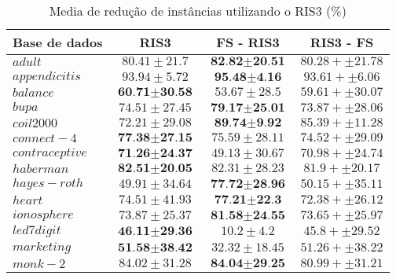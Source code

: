 \documentclass[a4paper, 12pt]{article}
\begin{document}
\begin{table}[h!]
  \begin{center}
    \caption{Media de redução de instâncias utilizando o RIS3 (\%)}
    \label{tab:table8}
    \begin{tabular}{l|c|c|c}
      \textbf{Base de dados} & \textbf{ RIS3 } & \textbf{FS - RIS3} & \textbf{RIS3 - FS}\\
        \hline
        $adult$ & $80.41 \pm 21.7$  & $\textbf{82.82} \pm \textbf{20.51}$ & $80.28 +  \pm 21.78$ \\
        \hline
        $appendicitis$ & $93.94 \pm 5.72$  & $\textbf{95.48} \pm \textbf{4.16}$ & $93.61 +  \pm 6.06$ \\
        \hline
        $balance$ & $\textbf{60.71} \pm \textbf{30.58}$  & $53.67 \pm 28.5$ & $59.61 +  \pm 30.07$ \\
        \hline
        $bupa$ & $74.51 \pm 27.45$  & $\textbf{79.17} \pm \textbf{25.01}$ & $73.87 +  \pm 28.06$ \\
        \hline
        $coil2000$ & $72.21 \pm 29.08$  & $\textbf{89.74} \pm \textbf{9.92}$ & $85.39 +  \pm 11.28$ \\
        \hline
        $connect-4$ & $\textbf{77.38} \pm \textbf{27.15}$  & $75.59 \pm 28.11$ & $74.52 +  \pm 29.09$ \\
        \hline
        $contraceptive$ & $\textbf{71.26} \pm \textbf{24.37}$  & $49.13 \pm 30.67$ & $70.98 +  \pm 24.74$ \\
        \hline
        $haberman$ & $\textbf{82.51} \pm \textbf{20.05}$  & $82.31 \pm 28.23$ & $81.9 +  \pm 20.17$ \\
        \hline
        $hayes-roth$ & $49.91 \pm 34.64$  & $\textbf{77.72} \pm \textbf{28.96}$ & $50.15 +  \pm 35.11$ \\
        \hline
        $heart$ & $74.51 \pm 41.93$  & $\textbf{77.21} \pm \textbf{22.3}$ & $72.38 +  \pm 26.12$ \\
        \hline
        $ionosphere$ & $73.87 \pm 25.37$  & $\textbf{81.58} \pm \textbf{24.55}$ & $73.65 +  \pm 25.97$ \\
        \hline
        $led7digit$ & $\textbf{46.11} \pm \textbf{29.36}$  & $10.2 \pm 4.2$ & $45.8 +  \pm 29.52$ \\
        \hline
        $marketing$ & $\textbf{51.58} \pm \textbf{38.42}$  & $32.32 \pm 18.45$ & $51.26 +  \pm 38.22$ \\
        \hline
        $monk-2$ & $84.02 \pm 31.28$  & $\textbf{84.04} \pm \textbf{29.25}$ & $80.99 +  \pm 31.21$ \\

\end{tabular}
\end{center}
\end{table}
\end{document}
